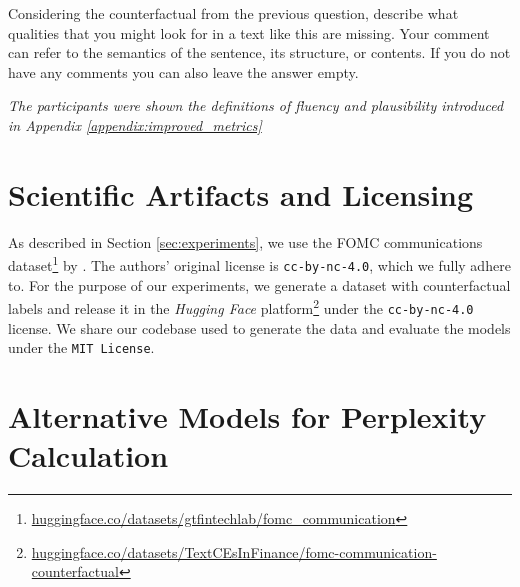 \documentclass[11pt]{article}
\begin{document}
Considering the counterfactual from the previous question, describe what qualities that you might look for in a text like this are missing. Your comment can refer to the semantics of the sentence, its structure, or contents. If you do not have any comments you can also leave the answer empty.

\textit{The participants were shown the definitions of fluency and plausibility introduced in Appendix \ref{appendix:improved_metrics}}

\section{Scientific Artifacts and Licensing}

As described in Section \ref{sec:experiments}, we use the FOMC communications dataset\footnote{\href{https://huggingface.co/datasets/gtfintechlab/fomc_communication}{huggingface.co/datasets/gtfintechlab/fomc\_communication}} by \citet{shah_trillion_2023}. The authors' original license is \texttt{cc-by-nc-4.0}, which we fully adhere to. For the purpose of our experiments, we generate a dataset with counterfactual labels and release it in the \textit{Hugging Face} platform\footnote{\href{https://huggingface.co/datasets/TextCEsInFinance/fomc-communication-counterfactual}{huggingface.co/datasets/TextCEsInFinance/fomc-communication-counterfactual}}  under the \texttt{cc-by-nc-4.0} license. We share our codebase used to generate the data and evaluate the models under the \texttt{MIT License}.

\section{Alternative Models for Perplexity Calculation}
\end{document}
